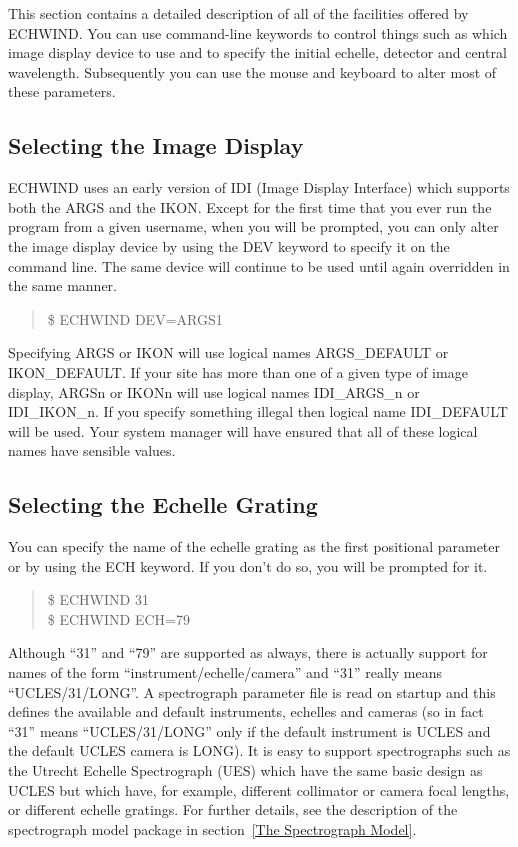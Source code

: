 This section contains a detailed description of all of the facilities offered
by ECHWIND. You can use command-line keywords to control things such as which
image display device to use and to specify the initial echelle, detector and
central wavelength. Subsequently you can use the mouse and keyboard to alter
most of these parameters.

\subsection{Selecting the Image Display}

ECHWIND uses an early version of IDI (Image Display Interface) which supports
both the ARGS and the IKON. Except for the first time that you ever run the
program from a given username, when you will be prompted, you can only alter
the image display device by using the DEV keyword to specify it on the command
line. The same device will continue to be used until again overridden in the
same manner.
\begin{quote}
\$ ECHWIND DEV=ARGS1
\end{quote}

Specifying ARGS or IKON will use logical names ARGS\_DEFAULT or IKON\_DEFAULT.
If your site has more than one of a given type of image display, ARGSn or IKONn
will use logical names IDI\_ARGS\_n or IDI\_IKON\_n. If you specify something
illegal then logical name IDI\_DEFAULT will be used. Your system manager will
have ensured that all of these logical names have sensible values.

\subsection{Selecting the Echelle Grating}

You can specify the name of the echelle grating as the first positional
parameter or by using the ECH keyword. If you don't do so, you will be prompted
for it.
\begin{quote}
\$ ECHWIND 31 \\
\$ ECHWIND ECH=79
\end{quote}

Although ``31'' and ``79'' are supported as always, there is actually support
for names of the form ``instrument/echelle/camera'' and ``31'' really means
``UCLES/31/LONG''. A spectrograph parameter file is read on startup and this
defines the available and default instruments, echelles and cameras (so in fact
``31'' means ``UCLES/31/LONG'' only if the default instrument is UCLES and
the default UCLES camera is LONG). It is easy to support spectrographs such as
the Utrecht Echelle Spectrograph (UES) which have the same basic design as
UCLES but which have, for example, different collimator or camera focal
lengths, or different echelle gratings. For further details, see the
description of the spectrograph model package in section~\ref{The Spectrograph
Model}.

